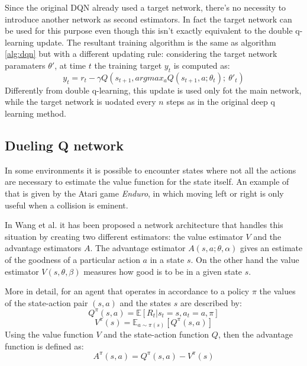 \documentclass[article,11pt]{article}
\begin{document}
	Since the original DQN already used a target network, there's no necessity to introduce another network as second estimators. In fact the target network can be used for this purpose even though this isn't exactly equivalent to the double q-learning update. The resultant training algorithm is the same as algorithm \ref{alg:dqn} but with a different updating rule: considering the target network paramaters $\theta'$, at time $t$ the training target $y_t$ is computed as:
	\begin{equation}
		y_t = r_t - \gamma Q(s_{t+1}, argmax_aQ(s_{t+1}, a; \theta_t);\ \theta'_t)
	\end{equation}
	Differently from double q-learning, this update is used only fot the main network, while the target network is uodated every $n$ steps as in the original deep q learning method.
	
	\subsection{Dueling Q network}
	In some environments it is possible to encounter states where not all the actions are necessary to estimate the value function for the state itself. An example of that is given by the Atari game \textit{Enduro}, in which moving left or right is only useful when a collision is eminent.
	
	In Wang et al. \cite{duelingdqn} it has been proposed a network architecture that handles this situation by creating two different estimators: the value estimator $V$ and the advantage estimators $A$. The advantage estimator $A(s,a;\theta,\alpha)$ gives an estimate of the goodness of a particular action $a$ in a state $s$. On the other hand the value estimator $V(s,\theta,\beta)$ measures how good is to be in a given state $s$.
	
	More in detail, for an agent that operates in accordance to a policy $\pi$ the values of the state-action pair $(s,a)$ and the states $s$ are described by:
	\begin{equation}
		Q^\pi(s,a) = \mathbb{E}\left[R_t | s_t = s, a_t = a, \pi \right]
	\end{equation}
	\begin{equation}
		V^\pi(s) = \mathbb{E}_{a\sim \pi(s)} \left[ Q^\pi(s,a)\right]
	\end{equation}
	Using the value function $V$ and the state-action function $Q$, then the advantage function is defined as:
	\begin{equation}
		A^\pi(s,a) = Q^\pi(s,a) - V^\pi(s)
	\end{equation}
	
\end{document}
